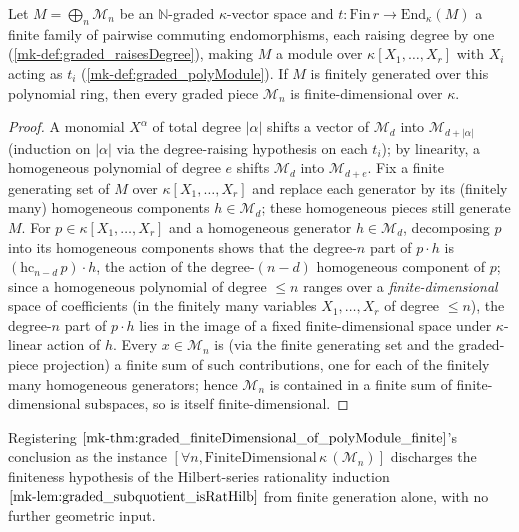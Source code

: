\begin{theorem}
  \label{mk-thm:graded_finiteDimensional_of_polyModule_finite}
  \leanok
  Let \(M = \bigoplus_n \mathcal{M}_n\) be an \(\mathbb{N}\)-graded
  \(\kappa\)-vector space and \(t \colon \mathrm{Fin}\,r \to
  \mathrm{End}_\kappa(M)\) a finite family of pairwise commuting
  endomorphisms, each raising degree by one
  (\ref{mk-def:graded_raisesDegree}), making \(M\) a module over
  \(\kappa[X_1, \dots, X_r]\) with \(X_i\) acting as \(t_i\)
  (\ref{mk-def:graded_polyModule}). If \(M\) is finitely generated over
  this polynomial ring, then every graded piece \(\mathcal{M}_n\) is
  finite-dimensional over \(\kappa\).
\end{theorem}
\begin{proof}
  \leanok
  A monomial \(X^\alpha\) of total degree \(|\alpha|\) shifts a vector
  of \(\mathcal{M}_d\) into \(\mathcal{M}_{d+|\alpha|}\) (induction on
  \(|\alpha|\) via the degree-raising hypothesis on each \(t_i\)); by
  linearity, a homogeneous polynomial of degree \(e\) shifts
  \(\mathcal{M}_d\) into \(\mathcal{M}_{d+e}\). Fix a finite generating
  set of \(M\) over \(\kappa[X_1,\dots,X_r]\) and replace each generator
  by its (finitely many) homogeneous components \(h \in \mathcal{M}_{d}\);
  these homogeneous pieces still generate \(M\). For \(p \in
  \kappa[X_1,\dots,X_r]\) and a homogeneous generator \(h \in
  \mathcal{M}_d\), decomposing \(p\) into its homogeneous components
  shows that the degree-\(n\) part of \(p \cdot h\) is
  \((\mathrm{hc}_{n-d}\,p) \cdot h\), the action of the degree-\((n-d)\)
  homogeneous component of \(p\); since a homogeneous polynomial of
  degree \(\le n\) ranges over a \emph{finite-dimensional} space of
  coefficients (in the finitely many variables \(X_1,\dots,X_r\) of
  degree \(\le n\)), the degree-\(n\) part of \(p \cdot h\) lies in the
  image of a fixed finite-dimensional space under \(\kappa\)-linear
  action of \(h\). Every \(x \in \mathcal{M}_n\) is (via the finite
  generating set and the graded-piece projection) a finite sum of such
  contributions, one for each of the finitely many homogeneous
  generators; hence \(\mathcal{M}_n\) is contained in a finite sum of
  finite-dimensional subspaces, so is itself finite-dimensional.
\end{proof}

\begin{remark}
  \label{mk-rem:graded_pieces_finite_consumer}
  Registering \(\ref{mk-thm:graded_finiteDimensional_of_polyModule_finite}\)'s
  conclusion as the instance \([\forall n,
  \mathrm{FiniteDimensional}\,\kappa\,(\mathcal{M}_n)]\) discharges the
  finiteness hypothesis of the Hilbert-series rationality induction
  \(\ref{mk-lem:graded_subquotient_isRatHilb}\) from finite generation
  alone, with no further geometric input.
\end{remark}
